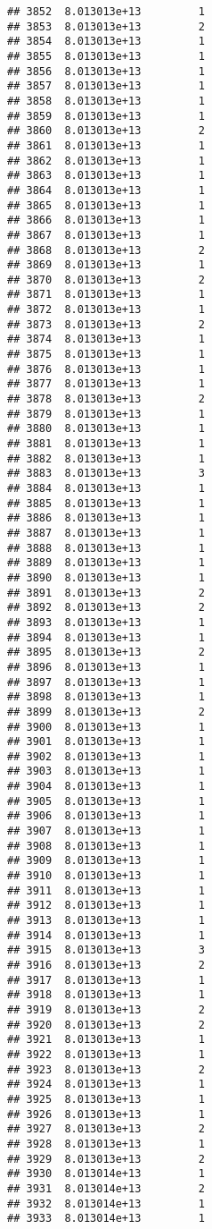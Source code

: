 \documentclass[
]{article}
\begin{document}
\begin{verbatim}
## 3852  8.013013e+13         1
## 3853  8.013013e+13         2
## 3854  8.013013e+13         1
## 3855  8.013013e+13         1
## 3856  8.013013e+13         1
## 3857  8.013013e+13         1
## 3858  8.013013e+13         1
## 3859  8.013013e+13         1
## 3860  8.013013e+13         2
## 3861  8.013013e+13         1
## 3862  8.013013e+13         1
## 3863  8.013013e+13         1
## 3864  8.013013e+13         1
## 3865  8.013013e+13         1
## 3866  8.013013e+13         1
## 3867  8.013013e+13         1
## 3868  8.013013e+13         2
## 3869  8.013013e+13         1
## 3870  8.013013e+13         2
## 3871  8.013013e+13         1
## 3872  8.013013e+13         1
## 3873  8.013013e+13         2
## 3874  8.013013e+13         1
## 3875  8.013013e+13         1
## 3876  8.013013e+13         1
## 3877  8.013013e+13         1
## 3878  8.013013e+13         2
## 3879  8.013013e+13         1
## 3880  8.013013e+13         1
## 3881  8.013013e+13         1
## 3882  8.013013e+13         1
## 3883  8.013013e+13         3
## 3884  8.013013e+13         1
## 3885  8.013013e+13         1
## 3886  8.013013e+13         1
## 3887  8.013013e+13         1
## 3888  8.013013e+13         1
## 3889  8.013013e+13         1
## 3890  8.013013e+13         1
## 3891  8.013013e+13         2
## 3892  8.013013e+13         2
## 3893  8.013013e+13         1
## 3894  8.013013e+13         1
## 3895  8.013013e+13         2
## 3896  8.013013e+13         1
## 3897  8.013013e+13         1
## 3898  8.013013e+13         1
## 3899  8.013013e+13         2
## 3900  8.013013e+13         1
## 3901  8.013013e+13         1
## 3902  8.013013e+13         1
## 3903  8.013013e+13         1
## 3904  8.013013e+13         1
## 3905  8.013013e+13         1
## 3906  8.013013e+13         1
## 3907  8.013013e+13         1
## 3908  8.013013e+13         1
## 3909  8.013013e+13         1
## 3910  8.013013e+13         1
## 3911  8.013013e+13         1
## 3912  8.013013e+13         1
## 3913  8.013013e+13         1
## 3914  8.013013e+13         1
## 3915  8.013013e+13         3
## 3916  8.013013e+13         2
## 3917  8.013013e+13         1
## 3918  8.013013e+13         1
## 3919  8.013013e+13         2
## 3920  8.013013e+13         2
## 3921  8.013013e+13         1
## 3922  8.013013e+13         1
## 3923  8.013013e+13         2
## 3924  8.013013e+13         1
## 3925  8.013013e+13         1
## 3926  8.013013e+13         1
## 3927  8.013013e+13         2
## 3928  8.013013e+13         1
## 3929  8.013013e+13         2
## 3930  8.013014e+13         1
## 3931  8.013014e+13         2
## 3932  8.013014e+13         1
## 3933  8.013014e+13         1

\end{verbatim}
\end{document}
